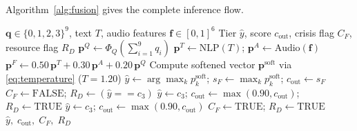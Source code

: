 \documentclass[10pt, conference, letterpaper]{IEEEtran}
\begin{document}
\begin{table}[!t]
\caption{HRE Module: Complete Decision Matrix}
\label{tab:hre}
\centering
{}
\end{table}

Algorithm~\ref{alg:fusion} gives the complete inference flow.

\begin{algorithm}[!t]
\caption{MindScreen Tri-Modal Inference with HRE}
\label{alg:fusion}
\begin{algorithmic}[1]
\REQUIRE $\mathbf{q} \in \{0,1,2,3\}^9$, text $T$, audio features $\mathbf{f} \in [0,1]^6$
\ENSURE Tier $\hat{y}$, score $c_{\text{out}}$, crisis flag $C_F$, resource flag $R_D$
\STATE $\mathbf{p}^Q \leftarrow \Phi_Q\!\left(\sum_{i=1}^9 q_i\right)$
\STATE $\mathbf{p}^T \leftarrow \text{NLP}(T)$;\; $\mathbf{p}^A \leftarrow \text{Audio}(\mathbf{f})$
\STATE $\mathbf{p}^F \leftarrow 0.50\,\mathbf{p}^T + 0.30\,\mathbf{p}^A + 0.20\,\mathbf{p}^Q$
\STATE Compute softened vector $\mathbf{p}^{\text{soft}}$ via \eqref{eq:temperature} ($T=1.20$)
\STATE $\hat{y} \leftarrow \arg\max_k p_k^{\text{soft}}$;\; $s_F \leftarrow \max_k p_k^{\text{soft}}$;\; $c_{\text{out}} \leftarrow s_F$
\STATE $C_F \leftarrow \text{FALSE}$;\; $R_D \leftarrow (\hat{y} == c_3)$
  \STATE $\hat{y} \leftarrow c_3$;\; $c_{\text{out}} \leftarrow \max(0.90, c_{\text{out}})$;\; $R_D \leftarrow \text{TRUE}$
\ENDIF
{}
  \STATE $\hat{y} \leftarrow c_3$;\; $c_{\text{out}} \leftarrow \max(0.90, c_{\text{out}})$
  \STATE $C_F \leftarrow \text{TRUE}$;\; $R_D \leftarrow \text{TRUE}$
\ENDIF
\RETURN $\hat{y},\; c_{\text{out}},\; C_F,\; R_D$
\end{algorithmic}
\end{algorithm}
\end{document}
